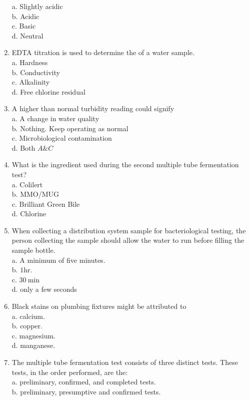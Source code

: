 \begin{enumerate}[1.]
a. Slightly acidic\\
b. Acidic\\
c. Basic\\
d. Neutral\\
\item EDTA titration is used to determine the of a water sample.\\
a. Hardness\\
b. Conductivity\\
c. Alkalinity\\
d. Free chlorine residual\\
\item A higher than normal turbidity reading could signify\\
a. A change in water quality\\
b. Nothing. Keep operating as normal\\
c. Microbiological contamination\\
d. Both $A \& C$\\
\item What is the ingredient used during the second multiple tube fermentation test?\\
a. Colilert\\
b. MMO/MUG\\
c. Brilliant Green Bile \\
d. Chlorine\\
\item When collecting a distribution system sample for bacteriological testing, the person collecting the sample should allow the water to run before filling the sample bottle.\\
a. A minimum of five minutes.\\
b. $1 \mathrm{hr}$.\\
c. $30 \mathrm{~min}$\\
d. only a few seconds\\
\item Black stains on plumbing fixtures might be attributed to\\
a. calcium.\\
b. copper.\\
c. magnesium.\\
d. manganese.\\
\item The multiple tube fermentation test consists of three distinct tests. These tests, in the order performed, are the:\\
a. preliminary, confirmed, and completed tests.\\
b. preliminary, presumptive and confirmed tests.\\

\end{enumerate}

